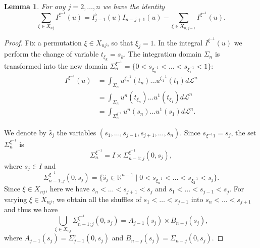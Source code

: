 \documentclass[12pt, reqno]{amsart}
\theoremstyle{plain}
\newtheorem {lemma}[theorem]{Lemma}
\theoremstyle{definition}
\theoremstyle{remark}
\numberwithin{equation}{section}
\newcommand{\R}{\mathbb{R}}
\renewcommand{\L}{\mathcal{L}}
\newcommand{\0}{\theta}
\newcommand{\1}{{-1}}
\renewcommand{\=}{\coloneqq}
\renewcommand{\.}{\dots}
\begin{document}
 \begin{lemma} \label{oggi}
  For any $j=2,\dots, n$ we have the identity
  \begin{equation}\label{fan}
   \sum_{\xi\in X_{nj}} I^{ \xi^\1}(u)=
    I_{j-1}^\flat  (u)I_{n-j+1}  (u)
   -
    \sum_{\xi\in X_{n,j-1}} I^{ \xi^\1}(u).
 \end{equation}
 \end{lemma}



\begin{proof}



Fix a permutation $\xi\in X_{nj}$, so that $\xi_ j =1$. In the integral
 $I^{\xi^{-1}}(u)$ we perform the   change of variable $t_{\xi_ k}=s_k$. The integration domain
$\Sigma_n$ is transformed into the new  domain    $ \Sigma_n^{\xi^\1} = \{0<s_{ \xi ^{-1}_ n}<\dots <s_{ \xi ^{-1} _1}<1\}$:
 \begin{equation} \label{buf}
 \begin{split}  I^{ \xi^\1} (u) & =  \int_{\Sigma_n }  u^ {\xi^{-1} _n} (t_n)\dots u^ {\xi^{-1} _1} (t_1) d\L^n
 \\
 &
 =  \int_{\Sigma_n }  u^{n} (t_{\xi_ n})\dots u^{1} (t_{\xi _1}) d\L^n
  \\
 & =
  \int_{\Sigma_n^{ \xi^{-1}} }    u^{n} (s_n)\dots  u^{1} (s_1) d\L^n.
 \end{split}
 \end{equation}

We denote by $ \widehat s_j$ the variables $(s_1,\dots, s_{j-1}, s_{j+1},\dots,s_n)$.
Since   $s_{ \xi ^{-1} 1}=s_j$, the set $   \Sigma_n ^{\xi^{-1} }$ is
 \[
   \Sigma_n ^{\xi^{-1} }= I  \times\Sigma_{n-1;j} ^{ \xi^\1} (0,s_j),
\]
where $s_j\in I $ and
\[
\Sigma_{n-1;j} ^{ \xi^\1} (0,s_j)=\big\{ \widehat  s_j\in\R^{n-1} \mid0<s_{\xi^\1_n}<\.<s_{\xi^\1_2}<s_j \big\}.
\]
Since $\xi\in X_{nj}$, here we have $s_n<\.<s_{j+1}<s_j$ and $s_1<\.<s_{j-1}<s_j$. For varying  $\xi\in X_{nj}$, we obtain all the shuffles of  $s_1<\.<s_{j-1}$ into $s_n<\.<s_{j+1}$ and thus we have
\[
\bigcup_{\xi \in X_{nj} }
\Sigma_{n-1;j} ^{ \xi^\1} (0,s_j)=  A_{j-1}(s_j)\times B_{n-j}(s_j),
\]
 where $A_{j-1}(s_j)=
\Sigma_{j-1}^\flat (0,s_j)$ and $  B_{n-j}(s_j)=
\Sigma_{n-j}  (0,s_j)$.



\end{proof}
\end{document}
